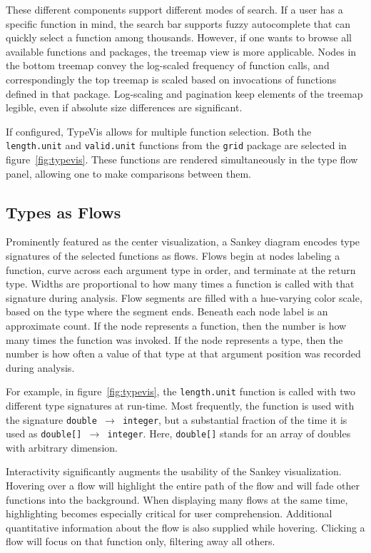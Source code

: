 \documentclass{vgtc}                          %
\begin{document}
These different components support different modes of search.
If a user has a specific function in mind,
the search bar supports fuzzy autocomplete
that can quickly select a function among thousands.
However, if one wants to browse
all available functions and packages,
the treemap view is more applicable.
Nodes in the bottom treemap convey the log-scaled
frequency of function calls,
and correspondingly the top treemap
is scaled based on invocations
of functions defined in that package.
Log-scaling and pagination keep
elements of the treemap legible,
even if absolute size differences are significant.

If configured, {\sc TypeVis} allows for multiple function selection.
Both the {\tt length.unit} and {\tt valid.unit} functions
from the {\tt grid} package are selected in figure~\ref{fig:typevis}.
These functions are rendered simultaneously in the type flow
panel, allowing one to make comparisons between them.

\subsection{Types as Flows}

Prominently featured as the center visualization,
a Sankey diagram encodes type signatures of the selected
functions as flows.
Flows begin at nodes labeling a function,
curve across each argument type in order,
and terminate at the return type.
Widths are proportional to how many times a function
is called with that signature during analysis.
Flow segments are filled with a hue-varying color scale,
based on the type where the segment ends.
Beneath each node label is an approximate count.
If the node represents a function, then the
number is how many times the function was invoked.
If the node represents a type, then the
number is how often a value of that type
at that argument position was recorded during analysis.

For example, in figure~\ref{fig:typevis},
the {\tt length.unit} function is called with
two different type signatures at run-time.
Most frequently, the function is used with the
signature {\tt double $\to$ integer},
but a substantial fraction of the time it is
used as {\tt double[] $\to$ integer}.
Here, {\tt double[]} stands for an array of
doubles with arbitrary dimension.

Interactivity significantly augments the
usability of the Sankey visualization.
Hovering over a flow will highlight the
entire path of the flow
and will fade other functions
into the background.
When displaying many flows at the same time,
highlighting becomes especially critical
for user comprehension.
Additional quantitative information
about the flow is also supplied
while hovering.
Clicking a flow will focus on that function
only, filtering away all others.
\end{document}
